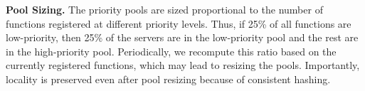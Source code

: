   



\noindent \textbf{Pool Sizing.}
The priority pools are sized proportional to the number of functions registered at different priority levels.
Thus, if 25\% of all functions are low-priority, then 25\% of the servers are in the low-priority pool and the rest are in the high-priority pool.
Periodically, we recompute this ratio based on the currently registered functions, which may lead to resizing the pools.
Importantly, locality is preserved even after pool resizing because of consistent hashing. 

